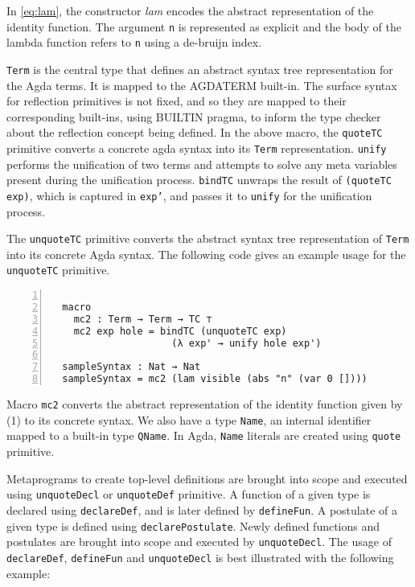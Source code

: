 \documentclass[sigplan,10pt]{acmart}
\begin{document}
In \eqref{eq:lam}, the constructor \emph{lam} encodes the abstract representation of the identity function. The argument {\tt n} is represented as explicit and the body of the lambda function refers to {\tt n} using a de-bruijn index.   

{\tt Term} is the central type that defines an abstract syntax tree representation for the Agda terms. It is mapped to the AGDATERM built-in. The surface syntax for reflection primitives is not fixed, and so they are mapped to their corresponding built-ins, using BUILTIN pragma, to inform the type checker about the reflection concept being defined. In the above macro, the {\tt quoteTC} primitive converts a concrete agda syntax into its {\tt Term} representation. {\tt unify} performs the unification of two terms and attempts to solve any meta variables present during the unification process. {\tt bindTC} unwraps the result of {\tt (quoteTC exp)}, which is captured in {\tt exp'}, and passes it to {\tt unify} for the unification process.

The {\tt unquoteTC} primitive converts the abstract syntax tree representation of {\tt Term} into its concrete Agda syntax. The following code gives an example usage for the {\tt unquoteTC} primitive.

\begin{center}
\begingroup
\fontsize{7pt}{9pt}\selectfont
\begin{Verbatim}[frame = lines, rulecolor=\color{blue}, numbers = left, numbersep = 0pt]

  macro
    mc2 : Term → Term → TC ⊤
    mc2 exp hole = bindTC (unquoteTC exp) 
                     (λ exp' → unify hole exp')

  sampleSyntax : Nat → Nat
  sampleSyntax = mc2 (lam visible (abs "n" (var 0 [])))

\end{Verbatim}
\endgroup
\end{center}

\normalsize

Macro {\tt mc2} converts the abstract representation of the identity function given by (1) to its concrete syntax. We also have a type {\tt Name}, an internal identifier mapped to a built-in type {\tt QName}. In Agda, {\tt Name} literals are created using {\tt quote} primitive.

Metaprograms to create top-level definitions are brought into scope and executed using {\tt unquoteDecl} or {\tt unquoteDef} primitive. A function of a given type is declared using {\tt declareDef}, and is later defined by {\tt defineFun}. A postulate of a given type is defined using {\tt declarePostulate}. Newly defined functions and postulates are brought into scope and executed by {\tt unquoteDecl}. The usage of {\tt declareDef}, {\tt defineFun} and {\tt unquoteDecl} is best illustrated with the following example:
\end{document}
